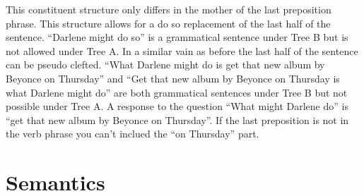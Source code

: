 \documentclass[20pt]{article}
\begin{document}
This constituent structure only differs in the mother of the last preposition
phrase. This structure allows for a do so replacement of the last half of the
sentence. ``Darlene might do so'' is a grammatical sentence under Tree B but is not allowed
under Tree A. In a similar vain as before the last half of the sentence can be
pseudo clefted. ``What Darlene might do is get that new album by Beyonce on
Thursday'' and ``Get that new album by Beyonce on Thursday is what Darlene
might do'' are both grammatical sentences under Tree B but not possible under
Tree A. A response to the question ``What might Darlene do'' is ``get that new
album by Beyonce on Thursday''. If the last preposition is not in the verb
phrase you can't inclued the ``on Thursday'' part.

\section{Semantics}
\end{document}
